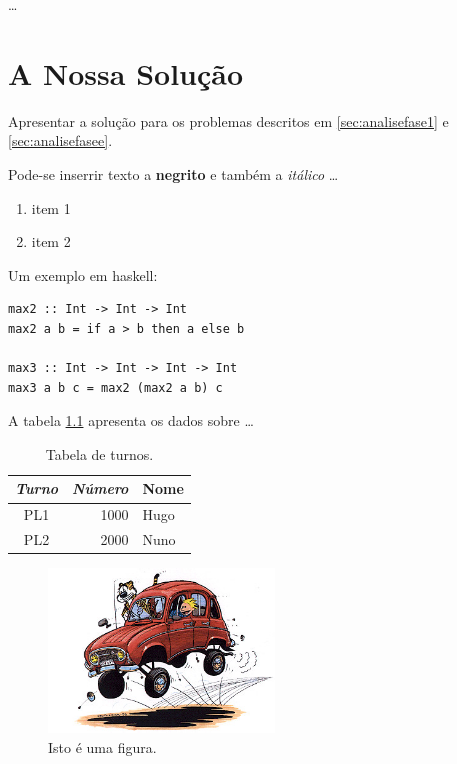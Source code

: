 \documentclass[a4paper]{report} %
\begin{document}
\ldots


\chapter{A Nossa Solução}
\label{sec:solucao}

Apresentar a solução para os problemas descritos em \ref{sec:analisefase1} e \ref{sec:analisefasee}.

Pode-se inserrir texto a \textbf{negrito} e também a \textit{itálico} \ldots

\begin{enumerate}
\item item 1
\item item 2
\end{enumerate}

Um exemplo em haskell:
\begin{verbatim}
max2 :: Int -> Int -> Int
max2 a b = if a > b then a else b

max3 :: Int -> Int -> Int -> Int
max3 a b c = max2 (max2 a b) c
\end{verbatim}


A tabela \ref{tbl:tabela} apresenta os dados sobre \ldots

\begin{table}[t]
\begin{center}
\begin{tabular}{|c|r||l|}
	\hline
	\emph{Turno} & \textit{Número} & \textbf{Nome}\\
	\hline
	\hline
	PL1 & 1000 & Hugo\\
	PL2 & 2000 & Nuno\\
	\hline
\end{tabular}
\end{center}
\caption{Tabela de turnos.}
\label{tbl:tabela}
\end{table}

\begin{figure}[tb]
\begin{center}
\includegraphics[width=6cm]{calvin.jpg}
\end{center}
\caption{Isto é uma figura.}
\label{manel}
\end{figure}
\end{document}
